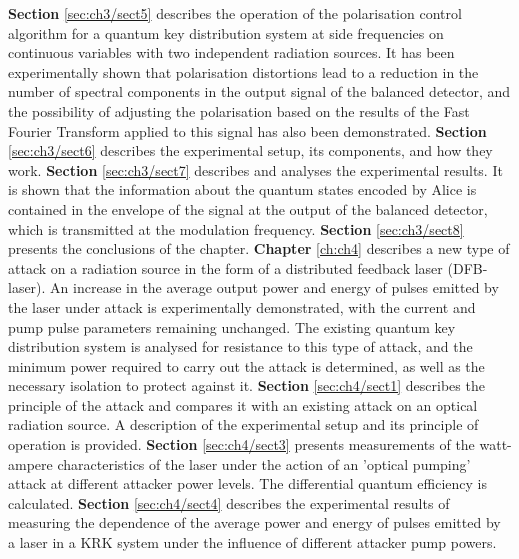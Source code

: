 \newline \textbf{Section} \ref{sec:ch3/sect5} describes the operation of the polarisation control algorithm for a quantum key distribution system at side frequencies on continuous variables with two independent radiation sources. It has been experimentally shown that polarisation distortions lead to a reduction in the number of spectral components in the output signal of the balanced detector, and the possibility of adjusting the polarisation based on the results of the Fast Fourier Transform applied to this signal has also been demonstrated.
\newline \textbf{Section} \ref{sec:ch3/sect6} describes the experimental setup, its components, and how they work.
\newline \textbf{Section} \ref{sec:ch3/sect7} describes and analyses the experimental results. It is shown that the information about the quantum states encoded by Alice is contained in the envelope of the signal at the output of the balanced detector, which is transmitted at the modulation frequency.
\newline \textbf{Section} \ref{sec:ch3/sect8} presents the conclusions of the chapter.
\newline \textbf{Chapter} \ref{ch:ch4} describes a new type of attack on a radiation source in the form of a distributed feedback laser (DFB-laser). An increase in the average output power and energy of pulses emitted by the laser under attack is experimentally demonstrated, with the current and pump pulse parameters remaining unchanged. The existing quantum key distribution system is analysed for resistance to this type of attack, and the minimum power required to carry out the attack is determined, as well as the necessary isolation to protect against it.
\newline \textbf{Section} \ref{sec:ch4/sect1} describes the principle of the attack and compares it with an existing attack on an optical radiation source. A description of the experimental setup and its principle of operation is provided.
\newline \textbf{Section} \ref{sec:ch4/sect3} presents measurements of the watt-ampere characteristics of the laser under the action of an 'optical pumping' attack at different attacker power levels. The differential quantum efficiency is calculated.
\newline \textbf{Section} \ref{sec:ch4/sect4} describes the experimental results of measuring the dependence of the average power and energy of pulses emitted by a laser in a KRK system under the influence of different attacker pump powers.
